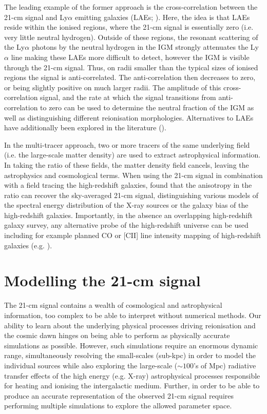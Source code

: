 The leading example of the former approach is the cross-correlation between the 21-cm signal and Ly$\alpha$ emitting galaxies (LAEs; \cite{Wyithe:2007,Wiersma:2013,Sobacchi:2016,Vrbanec:2016,Heneka:2017,Hutter:2017,Hutter:2018a,Kubota:2018}). Here, the idea is that LAEs reside within the ionised regions, where the 21-cm signal is essentially zero (i.e. very little neutral hydrogen). Outside of these regions, the resonant scattering of the Ly$\alpha$ photons by the neutral hydrogen in the IGM strongly attenuates the Ly$\alpha$ line making these LAEs more difficult to detect, however the IGM is visible through the 21-cm signal. Thus, on radii smaller than the typical sizes of ionised regions the signal is anti-correlated. The anti-correlation then decreases to zero, or being slightly positive on much larger radii. The amplitude of this cross-correlation signal, and the rate at which the signal transitions from anti-correlation to zero can be used to determine the neutral fraction of the IGM as well as distinguishing different reionisation morphologies. Alternatives to LAEs have additionally been explored in the literature (\cite{Furlanetto:2007,Lidz:2009,Park:2014,Beardsley:2015}).

In the multi-tracer approach, two or more tracers of the same underlying field (i.e. the large-scale matter density) are used to extract astrophysical information. In taking the ratio of these fields, the matter density field cancels, leaving the astrophysics and cosmological terms. When using the 21-cm signal in combination with a field tracing the high-redshift galaxies, \cite{Fialkov:2019a} found that the anisotropy in the ratio can recover the sky-averaged 21-cm signal, distinguishing various models of the spectral energy distribution of the X-ray sources or the galaxy bias of the high-redshift galaxies. Importantly, in the absence an overlapping high-redshift galaxy survey, any alternative probe of the high-redshift universe can be used including for example planned CO or [CII] line intensity mapping of high-redshift galaxies (e.g. \cite{Kovetz:2017,Moradinezhad:2019a,Moradinezhad:2019b}).

\section{Modelling the 21-cm signal} \label{sec:models}

The 21-cm signal contains a wealth of cosmological and astrophysical information, too complex to be able to interpret without numerical methods. Our ability to learn about the underlying physical processes driving reionisation and the cosmic dawn hinges on being able to perform as physically accurate simulations as possible. However, such simulations require an enormous dynamic range, simultaneously resolving the small-scales (sub-kpc) in order to model the individual sources while also exploring the large-scale ($\sim100$'s of Mpc) radiative transfer effects of the high energy (e.g. X-ray) astrophysical processes responsible for heating and ionising the intergalactic medium. Further, in order to be able to produce an accurate representation of the observed 21-cm signal requires performing multiple simulations to explore the allowed parameter space.

